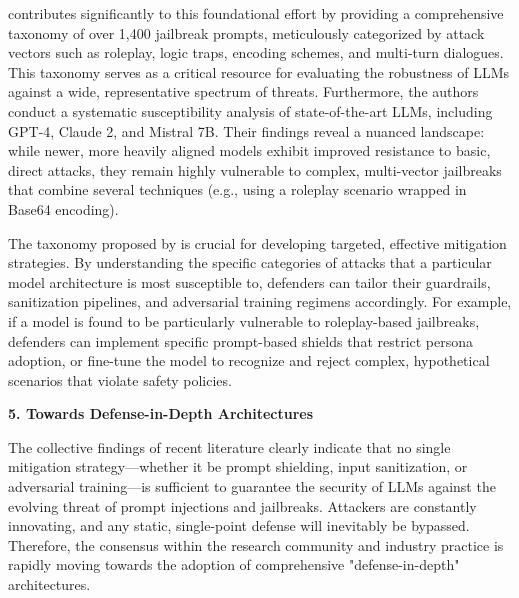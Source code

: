 \documentclass[11pt,a4paper]{article}
\begin{document}
\cite{Pathade_2025_LLMs} contributes significantly to this foundational effort by providing a comprehensive taxonomy of over 1,400 jailbreak prompts, meticulously categorized by attack vectors such as roleplay, logic traps, encoding schemes, and multi-turn dialogues. This taxonomy serves as a critical resource for evaluating the robustness of LLMs against a wide, representative spectrum of threats. Furthermore, the authors conduct a systematic susceptibility analysis of state-of-the-art LLMs, including GPT-4, Claude 2, and Mistral 7B. Their findings reveal a nuanced landscape: while newer, more heavily aligned models exhibit improved resistance to basic, direct attacks, they remain highly vulnerable to complex, multi-vector jailbreaks that combine several techniques (e.g., using a roleplay scenario wrapped in Base64 encoding). 

The taxonomy proposed by \cite{Pathade_2025_LLMs} is crucial for developing targeted, effective mitigation strategies. By understanding the specific categories of attacks that a particular model architecture is most susceptible to, defenders can tailor their guardrails, sanitization pipelines, and adversarial training regimens accordingly. For example, if a model is found to be particularly vulnerable to roleplay-based jailbreaks, defenders can implement specific prompt-based shields that restrict persona adoption, or fine-tune the model to recognize and reject complex, hypothetical scenarios that violate safety policies.

\textbf{5. Towards Defense-in-Depth Architectures}

The collective findings of recent literature clearly indicate that no single mitigation strategy---whether it be prompt shielding, input sanitization, or adversarial training---is sufficient to guarantee the security of LLMs against the evolving threat of prompt injections and jailbreaks. Attackers are constantly innovating, and any static, single-point defense will inevitably be bypassed. Therefore, the consensus within the research community and industry practice is rapidly moving towards the adoption of comprehensive "defense-in-depth" architectures.
\end{document}
